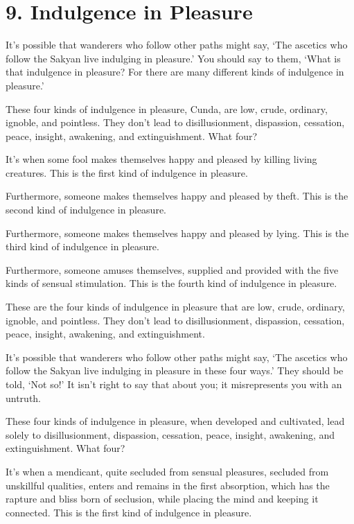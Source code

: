 \documentclass[12pt,openany]{book}%
\begin{document}
\section*{9. Indulgence in Pleasure }

It’s possible that wanderers who follow other paths might say, ‘The ascetics who follow the Sakyan live indulging in pleasure.’ You should say to them, ‘What is that indulgence in pleasure? For there are many different kinds of indulgence in pleasure.’ 

These four kinds of indulgence in pleasure, Cunda, are low, crude, ordinary, ignoble, and pointless. They don’t lead to disillusionment, dispassion, cessation, peace, insight, awakening, and extinguishment. What four? 

It’s when some fool makes themselves happy and pleased by killing living creatures. This is the first kind of indulgence in pleasure. 

Furthermore, someone makes themselves happy and pleased by theft. This is the second kind of indulgence in pleasure. 

Furthermore, someone makes themselves happy and pleased by lying. This is the third kind of indulgence in pleasure. 

Furthermore, someone amuses themselves, supplied and provided with the five kinds of sensual stimulation. This is the fourth kind of indulgence in pleasure. 

These are the four kinds of indulgence in pleasure that are low, crude, ordinary, ignoble, and pointless. They don’t lead to disillusionment, dispassion, cessation, peace, insight, awakening, and extinguishment. 

It’s possible that wanderers who follow other paths might say, ‘The ascetics who follow the Sakyan live indulging in pleasure in these four ways.’ They should be told, ‘Not so!’ It isn’t right to say that about you; it misrepresents you with an untruth. 

These four kinds of indulgence in pleasure, when developed and cultivated, lead solely to disillusionment, dispassion, cessation, peace, insight, awakening, and extinguishment. What four? 

It’s when a mendicant, quite secluded from sensual pleasures, secluded from unskillful qualities, enters and remains in the first absorption, which has the rapture and bliss born of seclusion, while placing the mind and keeping it connected. This is the first kind of indulgence in pleasure. 
\end{document}
